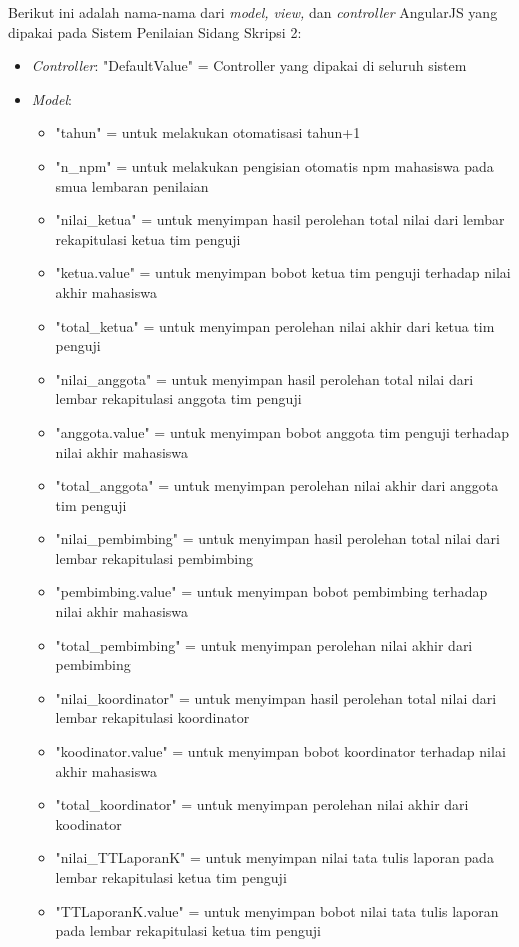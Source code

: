 	Berikut ini adalah nama-nama dari \textit{model, view,} dan \textit{controller} AngularJS yang dipakai pada Sistem Penilaian Sidang Skripsi 2:
	\begin{itemize}
		\item \textit{Controller}: "DefaultValue" = Controller yang dipakai di seluruh sistem
		\item \textit{Model}:
		\begin{itemize}
			\item "tahun" = untuk melakukan otomatisasi tahun+1
			\item "n\_npm" = untuk melakukan pengisian otomatis npm mahasiswa pada smua lembaran penilaian
			\item "nilai\_ketua" = untuk menyimpan hasil perolehan total nilai dari lembar rekapitulasi ketua tim penguji
			\item "ketua.value" = untuk menyimpan bobot ketua tim penguji terhadap nilai akhir mahasiswa
			\item "total\_ketua" = untuk menyimpan perolehan nilai akhir dari ketua tim penguji
			\item "nilai\_anggota" = untuk menyimpan hasil perolehan total nilai dari lembar rekapitulasi anggota tim penguji
			\item "anggota.value" = untuk menyimpan bobot anggota tim penguji terhadap nilai akhir mahasiswa
			\item "total\_anggota" = untuk menyimpan perolehan nilai akhir dari anggota tim penguji
			\item "nilai\_pembimbing" = untuk menyimpan hasil perolehan total nilai dari lembar rekapitulasi pembimbing
			\item "pembimbing.value" = untuk menyimpan bobot pembimbing terhadap nilai akhir mahasiswa
			\item "total\_pembimbing" = untuk menyimpan perolehan nilai akhir dari pembimbing
			\item "nilai\_koordinator" = untuk menyimpan hasil perolehan total nilai dari lembar rekapitulasi koordinator
			\item "koodinator.value" = untuk menyimpan bobot koordinator terhadap nilai akhir mahasiswa
			\item "total\_koordinator" = untuk menyimpan perolehan nilai akhir dari koodinator
			\item "nilai\_TTLaporanK" = untuk menyimpan nilai tata tulis laporan pada lembar rekapitulasi ketua tim penguji
			\item "TTLaporanK.value" = untuk menyimpan bobot nilai tata tulis laporan pada lembar rekapitulasi ketua tim penguji

\end{itemize}
\end{itemize}
